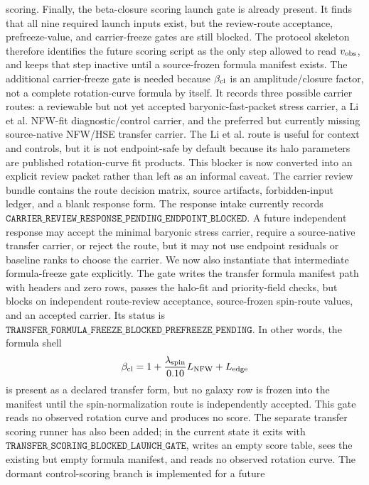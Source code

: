 \documentclass[11pt]{article}
\begin{document}
scoring.
Finally, the beta-closure scoring launch gate is already present.  It finds
that all nine required launch inputs exist, but the review-route acceptance,
prefreeze-value, and carrier-freeze gates are still blocked.  The protocol
skeleton therefore identifies the future scoring script as the only step
allowed to read \(v_{\rm obs}\), and keeps that step inactive until a
source-frozen formula manifest exists.
The additional carrier-freeze gate is needed because \(\beta_{\rm cl}\) is an
amplitude/closure factor, not a complete rotation-curve formula by itself.  It
records three possible carrier routes: a reviewable but not yet accepted
baryonic-fast-packet stress carrier, a Li et al. NFW-fit diagnostic/control
carrier, and the preferred but currently missing source-native NFW/HSE transfer
carrier.  The Li et al. route is useful for context and controls, but it is not
endpoint-safe by default because its halo parameters are published
rotation-curve fit products.
This blocker is now converted into an explicit review packet rather than left
as an informal caveat.  The carrier review bundle contains the route decision
matrix, source artifacts, forbidden-input ledger, and a blank response form.
The response intake currently records
\(\texttt{CARRIER\_REVIEW\_RESPONSE\_PENDING\_ENDPOINT\_BLOCKED}\).  A future
independent response may accept the minimal baryonic stress carrier, require a
source-native transfer carrier, or reject the route, but it may not use
endpoint residuals or baseline ranks to choose the carrier.
We now also instantiate that intermediate formula-freeze gate explicitly.  The
gate writes the transfer formula manifest path with headers and zero rows,
passes the halo-fit and priority-field checks, but blocks on independent
route-review acceptance, source-frozen spin-route values, and an accepted
carrier.  Its status is
\(\texttt{TRANSFER\_FORMULA\_FREEZE\_BLOCKED\_PREFREEZE\_PENDING}\).  In other
words, the formula shell
\[
  \beta_{\rm cl}
  =
  1+
  \frac{\lambda_{\rm spin}}{0.10}L_{\rm NFW}
  +L_{\rm edge}
\]
is present as a declared transfer form, but no galaxy row is frozen into the
manifest until the spin-normalization route is independently accepted.  This
gate reads no observed rotation curve and produces no score.
The separate transfer scoring runner has also been added; in the current state
it exits with
\(\texttt{TRANSFER\_SCORING\_BLOCKED\_LAUNCH\_GATE}\), writes an empty score
table, sees the existing but empty formula manifest, and reads no observed
rotation curve.  The dormant control-scoring branch is implemented for a future
\end{document}
